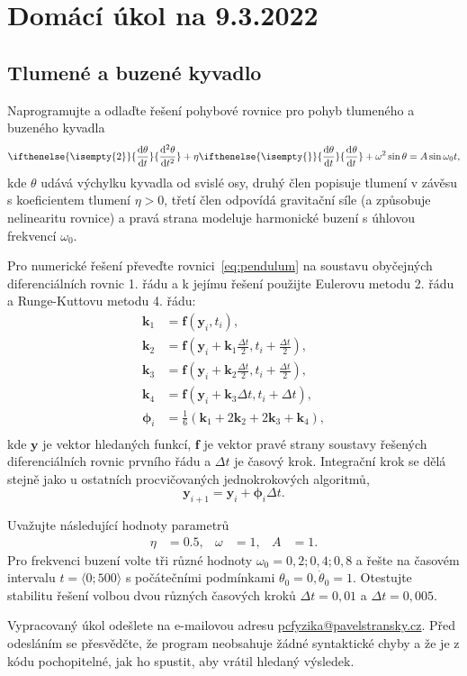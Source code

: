 \documentclass[a4paper,11pt,twoside]{article}
\def\vector#1{\boldsymbol{#1}}								%
\renewcommand{\d}{\mathrm{d}}
\newcommand{\derivative}[3][]{\ifthenelse{\isempty{#1}}	    %
	{\frac{\d{#2}}{\d{#3}}}
	{\frac{\d^{#1}{#2}}{\d{#3}^{#1}}}
}
\def\c{,\!}
\begin{document}
\section*{Domácí úkol na 9.3.2022}
\subsection*{Tlumené a buzené kyvadlo}
Naprogramujte a odlaďte řešení pohybové rovnice pro pohyb tlumeného a buzeného kyvadla
\begin{equation}
    \label{eq:pendulum}
    \derivative[2]{\theta}{t}+\eta\derivative{\theta}{t}+\omega^{2}\sin{\theta}=A\sin\omega_{0}t,
\end{equation}
kde $\theta$ udává výchylku kyvadla od svislé osy, druhý člen popisuje tlumení v závěsu s koeficientem tlumení $\eta>0$, třetí člen odpovídá gravitační síle (a způsobuje nelinearitu rovnice) a pravá strana modeluje harmonické buzení s úhlovou frekvencí $\omega_0$.

Pro numerické řešení převeďte rovnici~\eqref{eq:pendulum} na soustavu obyčejných diferenciálních rovnic 1. řádu a k jejímu řešení použijte Eulerovu metodu 2. řádu a Runge-Kuttovu metodu 4. řádu:
\begin{align*}
    \vector{k}_{1}&=\vector{f}(\vector{y}_{i},t_{i}),\\
    \vector{k}_{2}&=\vector{f}\left(\vector{y}_{i}+\vector{k}_{1}\frac{\Delta t}{2},t_{i}+\frac{\Delta t}{2}\right),\\
    \vector{k}_{3}&=\vector{f}\left(\vector{y}_{i}+\vector{k}_{2}\frac{\Delta t}{2},t_{i}+\frac{\Delta t}{2}\right),\\
    \vector{k}_{4}&=\vector{f}\left(\vector{y}_{i}+\vector{k}_{3}\Delta t,t_{i}+\Delta t\right),\\
    \vector{\phi}_{i}&=\frac{1}{6}\left(\vector{k}_{1}+2\vector{k}_{2}+2\vector{k}_{3}+\vector{k}_{4}\right),\\
\end{align*}
kde $\vector{y}$ je vektor hledaných funkcí, $\vector{f}$ je vektor pravé strany soustavy řešených diferenciálních rovnic prvního řádu a $\Delta t$ je časový krok.
Integrační krok se dělá stejně jako u ostatních procvičovaných jednokrokových algoritmů,
\begin{equation*}
    \vector{y}_{i+1}=\vector{y}_{i}+\vector{\phi}_{i}\Delta t.
\end{equation*}

Uvažujte následující hodnoty parametrů
\begin{align}
    \eta&=0.5,
    &\omega&=1,
    &A&=1.
\end{align}
Pro frekvenci buzení volte tři různé hodnoty $\omega_0=0\c2;0\c4;0\c8$ a řešte na časovém intervalu $t=\langle0;500\rangle$ s počátečními podmínkami $\theta_0=0,\dot{\theta}_{0}=1$.
Otestujte stabilitu řešení volbou dvou různých časových kroků $\Delta t=0\c01$ a $\Delta t=0\c005$.

Vypracovaný úkol odešlete na e-mailovou adresu \href{mailto:pcfyzika@pavelstransky.cz}{pcfyzika@pavelstransky.cz}.
Před odesláním se přesvědčte, že program neobsahuje žádné syntaktické chyby a že je z kódu pochopitelné, jak ho spustit, aby vrátil hledaný výsledek.
\end{document}
